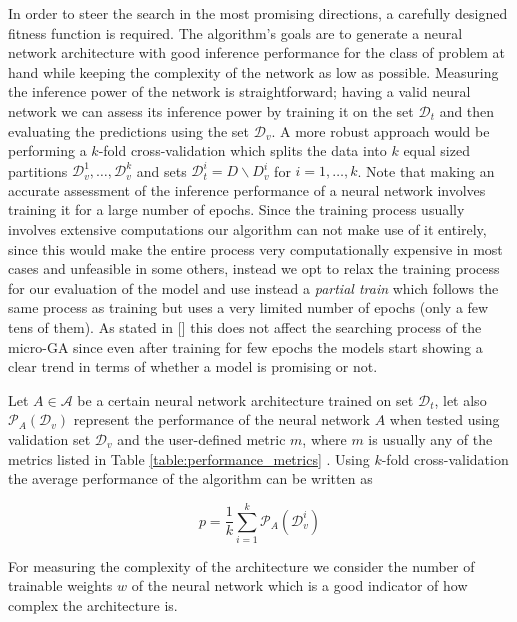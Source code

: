 \documentclass[journal]{IEEEtran}
\begin{document}
In order to steer the search in the most promising directions, a carefully designed fitness function is required. The algorithm's goals are to generate a neural network architecture with good inference performance for the class of problem at hand while keeping the complexity of the network as low as possible. Measuring the inference power of the network is straightforward; having a valid neural network we can assess its inference power by training it on the set $\mathcal{D}_{t}$ and then evaluating the predictions using the set $\mathcal{D}_{v}$. A more robust approach would be performing a $k$-fold cross-validation which splits the data into $k$ equal sized partitions $ \mathcal{D}^{1}_{v}, \ldots,  \mathcal{D}^{k}_{v}$ and sets $ \mathcal{D}^{i}_{t} =  D \backslash D^{i}_{v}$ for $i = 1, \ldots, k$. Note that making an accurate assessment of the inference performance of a neural network involves training it for a large number of epochs. Since the training process usually involves extensive computations our algorithm can not make use of it entirely, since this would make the entire process very computationally expensive in most cases and unfeasible in some others, instead we opt to relax the training process for our evaluation of the model and use instead a \textit{partial train} which follows the same process as training but uses a very limited number of epochs (only a few tens of them). As stated in [] this does not affect the searching process of the micro-GA since even after training for few epochs the models start showing a clear trend in terms of whether a model is promising or not.

Let $A \in \mathcal{A}$ be a certain neural network architecture trained on set $\mathcal{D}_{t}$, let also $\mathcal{P}_{A}(\mathcal{D}_{v})$ represent the performance of the neural network $A$ when tested using validation set $\mathcal{D}_{v}$ and the user-defined metric $m$, where $m$ is usually any of the metrics listed in Table \ref{table:performance_metrics} . Using $k$-fold cross-validation the average performance of the algorithm can be written as

\begin{equation}
p = \frac{1}{k} \sum_{i=1}^{k}  \mathcal{P}_{A}(\mathcal{D}^{i}_{v})
\label{eq:performance_crossval}
\end{equation}

For measuring the complexity of the architecture we consider the number of trainable weights $w$ of the neural network which is a good indicator of how complex the architecture is.
\end{document}
